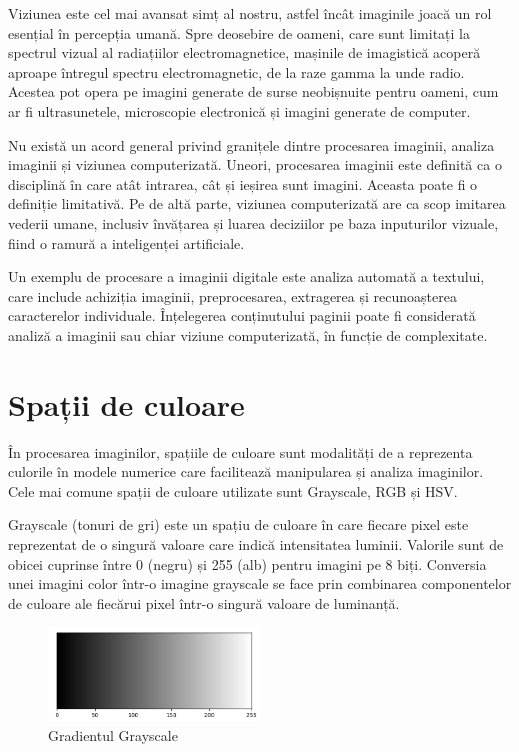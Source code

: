 \documentclass[a4paper,12pt]{report}
\begin{document}
Viziunea este cel mai avansat simț al nostru, astfel încât imaginile joacă un rol esențial în percepția umană. Spre deosebire de oameni, care sunt limitați la spectrul vizual al radiațiilor electromagnetice, mașinile de imagistică acoperă aproape întregul spectru electromagnetic, de la raze gamma la unde radio. Acestea pot opera pe imagini generate de surse neobișnuite pentru oameni, cum ar fi ultrasunetele, microscopie electronică și imagini generate de computer.

Nu există un acord general privind granițele dintre procesarea imaginii, analiza imaginii și viziunea computerizată. Uneori, procesarea imaginii este definită ca o disciplină în care atât intrarea, cât și ieșirea sunt imagini. Aceasta poate fi o definiție limitativă. Pe de altă parte, viziunea computerizată are ca scop imitarea vederii umane, inclusiv învățarea și luarea deciziilor pe baza inputurilor vizuale, fiind o ramură a inteligenței artificiale.

Un exemplu de procesare a imaginii digitale este analiza automată a textului, care include achiziția imaginii, preprocesarea, extragerea și recunoașterea caracterelor individuale. Înțelegerea conținutului paginii poate fi considerată analiză a imaginii sau chiar viziune computerizată, în funcție de complexitate.

\section{Spații de culoare}
În procesarea imaginilor, spațiile de culoare sunt modalități de a reprezenta culorile în modele numerice care facilitează manipularea și analiza imaginilor. Cele mai comune spații de culoare utilizate sunt Grayscale, RGB și HSV.

Grayscale (tonuri de gri) este un spațiu de culoare în care fiecare pixel este reprezentat de o singură valoare care indică intensitatea luminii. Valorile sunt de obicei cuprinse între 0 (negru) și 255 (alb) pentru imagini pe 8 biți. Conversia unei imagini color într-o imagine grayscale se face prin combinarea componentelor de culoare ale fiecărui pixel într-o singură valoare de luminanță.

\begin{figure}[h!]
    \centering
    \includegraphics[width=0.5\textwidth]{images/grayscale.jpg}
    \caption{Gradientul Grayscale}
\end{figure}
\FloatBarrier
\end{document}
